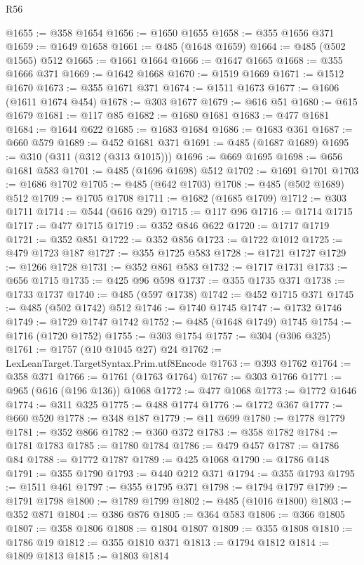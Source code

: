 \begin{lexlean}{R56}
\begin{coremodule}
@1655 := @358 @1654
@1656 := @1650 @1655
@1658 := @355 @1656 @371
@1659 := @1649 @1658
@1661 := @485 (@1648 @1659)
@1664 := @485 (@502 @1565) @512
@1665 := @1661 @1664
@1666 := @1647 @1665
@1668 := @355 @1666 @371
@1669 := @1642 @1668
@1670 := @1519 @1669
@1671 := @1512 @1670
@1673 := @355 @1671 @371
@1674 := @1511 @1673
@1677 := @1606 (@1611 @1674 @454)
@1678 := @303 @1677
@1679 := @616 @51
@1680 := @615 @1679
@1681 := @117 @85
@1682 := @1680 @1681
@1683 := @477 @1681
@1684 := @1644 @622
@1685 := @1683 @1684
@1686 := @1683 @361
@1687 := @660 @579
@1689 := @452 @1681 @371
@1691 := @485 (@1687 @1689)
@1695 := @310 (@311 (@312 (@313 @1015)))
@1696 := @669 @1695
@1698 := @656 @1681 @583
@1701 := @485 (@1696 @1698) @512
@1702 := @1691 @1701
@1703 := @1686 @1702
@1705 := @485 (@642 @1703)
@1708 := @485 (@502 @1689) @512
@1709 := @1705 @1708
@1711 := @1682 (@1685 @1709)
@1712 := @303 @1711
@1714 := @544 (@616 @29)
@1715 := @117 @96
@1716 := @1714 @1715
@1717 := @477 @1715
@1719 := @352 @846 @622
@1720 := @1717 @1719
@1721 := @352 @851
@1722 := @352 @856
@1723 := @1722 @1012
@1725 := @479 @1723 @187
@1727 := @355 @1725 @583
@1728 := @1721 @1727
@1729 := @1266 @1728
@1731 := @352 @861 @583
@1732 := @1717 @1731
@1733 := @656 @1715
@1735 := @425 @96 @598
@1737 := @355 @1735 @371
@1738 := @1733 @1737
@1740 := @485 (@597 @1738)
@1742 := @452 @1715 @371
@1745 := @485 (@502 @1742) @512
@1746 := @1740 @1745
@1747 := @1732 @1746
@1749 := @1729 @1747 @1742
@1752 := @485 (@1648 @1749) @1745
@1754 := @1716 (@1720 @1752)
@1755 := @303 @1754
@1757 := @304 (@306 @325)
@1761 := @1757 (@10 @1045 @27) @24
@1762 := LexLeanTarget.TargetSyntax.Prim.utf8Encode
@1763 := @393 @1762
@1764 := @358 @371
@1766 := @1761 (@1763 @1764)
@1767 := @303 @1766
@1771 := @965 (@616 (@196 @136)) @1068
@1772 := @477 @1068
@1773 := @1772 @1646
@1774 := @311 @325
@1775 := @488 @1774
@1776 := @1772 @367
@1777 := @660 @520
@1778 := @348 @187
@1779 := @11 @699
@1780 := @1778 @1779
@1781 := @352 @866
@1782 := @360 @372
@1783 := @358 @1782
@1784 := @1781 @1783
@1785 := @1780 @1784
@1786 := @479 @457
@1787 := @1786 @84
@1788 := @1772 @1787
@1789 := @425 @1068
@1790 := @1786 @148
@1791 := @355 @1790
@1793 := @440 @212 @371
@1794 := @355 @1793
@1795 := @1511 @461
@1797 := @355 @1795 @371
@1798 := @1794 @1797
@1799 := @1791 @1798
@1800 := @1789 @1799
@1802 := @485 (@1016 @1800)
@1803 := @352 @871
@1804 := @386 @876
@1805 := @364 @583
@1806 := @366 @1805
@1807 := @358 @1806
@1808 := @1804 @1807
@1809 := @355 @1808
@1810 := @1786 @19
@1812 := @355 @1810 @371
@1813 := @1794 @1812
@1814 := @1809 @1813
@1815 := @1803 @1814

\end{coremodule}
\end{lexlean}
